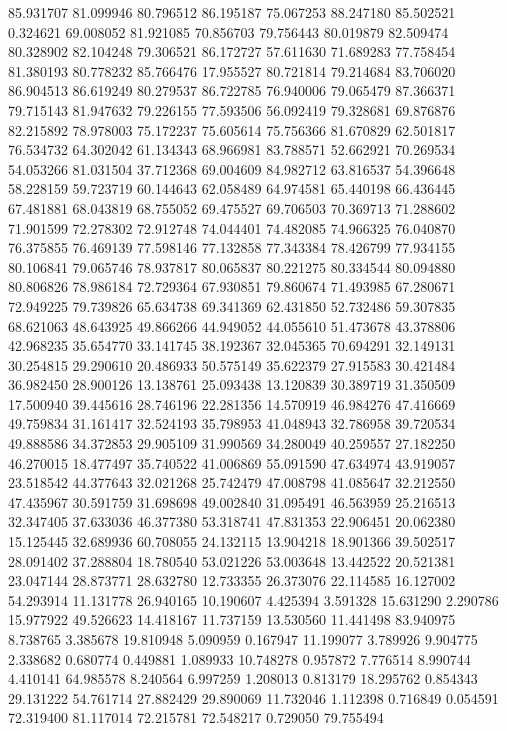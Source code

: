 85.931707
81.099946
80.796512
86.195187
75.067253
88.247180
85.502521
0.324621
69.008052
81.921085
70.856703
79.756443
80.019879
82.509474
80.328902
82.104248
79.306521
86.172727
57.611630
71.689283
77.758454
81.380193
80.778232
85.766476
17.955527
80.721814
79.214684
83.706020
86.904513
86.619249
80.279537
86.722785
76.940006
79.065479
87.366371
79.715143
81.947632
79.226155
77.593506
56.092419
79.328681
69.876876
82.215892
78.978003
75.172237
75.605614
75.756366
81.670829
62.501817
76.534732
64.302042
61.134343
68.966981
83.788571
52.662921
70.269534
54.053266
81.031504
37.712368
69.004609
84.982712
63.816537
54.396648
58.228159
59.723719
60.144643
62.058489
64.974581
65.440198
66.436445
67.481881
68.043819
68.755052
69.475527
69.706503
70.369713
71.288602
71.901599
72.278302
72.912748
74.044401
74.482085
74.966325
76.040870
76.375855
76.469139
77.598146
77.132858
77.343384
78.426799
77.934155
80.106841
79.065746
78.937817
80.065837
80.221275
80.334544
80.094880
80.806826
78.986184
72.729364
67.930851
79.860674
71.493985
67.280671
72.949225
79.739826
65.634738
69.341369
62.431850
52.732486
59.307835
68.621063
48.643925
49.866266
44.949052
44.055610
51.473678
43.378806
42.968235
35.654770
33.141745
38.192367
32.045365
70.694291
32.149131
30.254815
29.290610
20.486933
50.575149
35.622379
27.915583
30.421484
36.982450
28.900126
13.138761
25.093438
13.120839
30.389719
31.350509
17.500940
39.445616
28.746196
22.281356
14.570919
46.984276
47.416669
49.759834
31.161417
32.524193
35.798953
41.048943
32.786958
39.720534
49.888586
34.372853
29.905109
31.990569
34.280049
40.259557
27.182250
46.270015
18.477497
35.740522
41.006869
55.091590
47.634974
43.919057
23.518542
44.377643
32.021268
25.742479
47.008798
41.085647
32.212550
47.435967
30.591759
31.698698
49.002840
31.095491
46.563959
25.216513
32.347405
37.633036
46.377380
53.318741
47.831353
22.906451
20.062380
15.125445
32.689936
60.708055
24.132115
13.904218
18.901366
39.502517
28.091402
37.288804
18.780540
53.021226
53.003648
13.442522
20.521381
23.047144
28.873771
28.632780
12.733355
26.373076
22.114585
16.127002
54.293914
11.131778
26.940165
10.190607
4.425394
3.591328
15.631290
2.290786
15.977922
49.526623
14.418167
11.737159
13.530560
11.441498
83.940975
8.738765
3.385678
19.810948
5.090959
0.167947
11.199077
3.789926
9.904775
2.338682
0.680774
0.449881
1.089933
10.748278
0.957872
7.776514
8.990744
4.410141
64.985578
8.240564
6.997259
1.208013
0.813179
18.295762
0.854343
29.131222
54.761714
27.882429
29.890069
11.732046
1.112398
0.716849
0.054591
72.319400
81.117014
72.215781
72.548217
0.729050
79.755494
